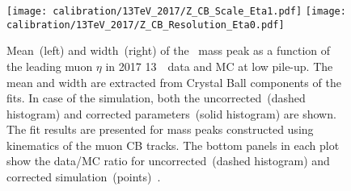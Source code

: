 	\begin{figure}[htb!]
		\begin{center}
			\texttt{[image: calibration/13TeV\_2017/Z\_CB\_Scale\_Eta1.pdf]}
			\texttt{[image: calibration/13TeV\_2017/Z\_CB\_Resolution\_Eta0.pdf]}
			\caption{Mean~(left) and width~(right) of the \Zmm\ mass peak as a function of the leading muon $\eta$ in 2017 13~\TeV\ data and MC at low pile-up. The mean and width are extracted from Crystal Ball components of the fits. In case of the simulation, both the uncorrected~(dashed histogram) and corrected parameters~(solid histogram) are shown. The fit results are presented for mass peaks constructed using kinematics of the muon CB tracks. The bottom panels in each plot show the data/MC ratio for uncorrected~(dashed histogram) and corrected simulation~(points)~\cite{int_note_muons}.}
			\label{fig:calib-Z-13TeV}
		\end{center}
	\end{figure}
